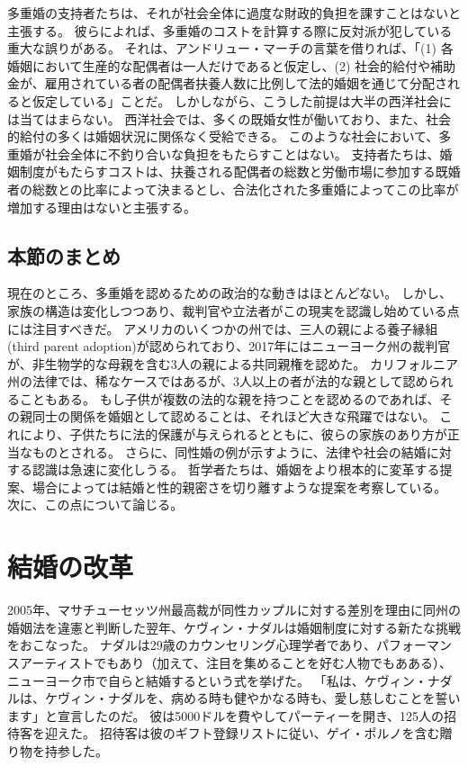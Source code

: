 \documentclass[paper=a4,book,openany]{jlreq} \usepackage{mystyle}
\begin{document}
多重婚の支持者たちは、それが社会全体に過度な財政的負担を課すことはないと主張する。
彼らによれば、多重婚のコストを計算する際に反対派が犯している重大な誤りがある。
それは、アンドリュー・マーチの言葉を借りれば、「(1) 各婚姻において生産的な配偶者は一人だけであると仮定し、(2) 社会的給付や補助金が、雇用されている者の配偶者扶養人数に比例して法的婚姻を通じて分配されると仮定している」ことだ\citep[p.268]{march11:_is_there_right_polyg}。
しかしながら、こうした前提は大半の西洋社会には当てはまらない。
西洋社会では、多くの既婚女性が働いており、また、社会的給付の多くは婚姻状況に関係なく受給できる。
このような社会において、多重婚が社会全体に不釣り合いな負担をもたらすことはない。
支持者たちは、婚姻制度がもたらすコストは、扶養される配偶者の総数と労働市場に参加する既婚者の総数との比率によって決まるとし、合法化された多重婚によってこの比率が増加する理由はないと主張する。

\subsection{本節のまとめ}

現在のところ、多重婚を認めるための政治的な動きはほとんどない。
しかし、家族の構造は変化しつつあり、裁判官や立法者がこの現実を認識し始めている点には注目すべきだ。
アメリカのいくつかの州では、三人の親による養子縁組(third parent adoption)が認められており、2017年にはニューヨーク州の裁判官が、非生物学的な母親を含む3人の親による共同親権を認めた。
カリフォルニア州の法律では、稀なケースではあるが、3人以上の者が法的な親として認められることもある。
もし子供が複数の法的な親を持つことを認めるのであれば、その親同士の関係を婚姻として認めることは、それほど大きな飛躍ではない。
これにより、子供たちに法的保護が与えられるとともに、彼らの家族のあり方が正当なものとされる。
さらに、同性婚の例が示すように、法律や社会の結婚に対する認識は急速に変化しうる。
哲学者たちは、婚姻をより根本的に変革する提案、場合によっては結婚と性的親密さを切り離すような提案を考察している。
次に、この点について論じる。

\section{結婚の改革}

2005年、マサチューセッツ州最高裁が同性カップルに対する差別を理由に同州の婚姻法を違憲と判断した翌年、ケヴィン・ナダルは婚姻制度に対する新たな挑戦をおこなった。
ナダルは29歳のカウンセリング心理学者であり、パフォーマンスアーティストでもあり（加えて、注目を集めることを好む人物でもあある）、ニューヨーク市で自らと結婚するという式を挙げた。
「私は、ケヴィン・ナダルは、ケヴィン・ナダルを、病める時も健やかなる時も、愛し慈しむことを誓います」と宣言したのだ。
彼は5000ドルを費やしてパーティーを開き、125人の招待客を迎えた。
招待客は彼のギフト登録リストに従い、ゲイ・ポルノを含む贈り物を持参した\citep{krum05:_man_who_married_himsel}。
\end{document}
